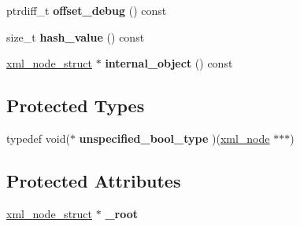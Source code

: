 \begin{DoxyCompactItemize}
\item 
\hypertarget{classpugi_1_1xml__node_a77b819bd87978bebefe75d421a793cf3}{ptrdiff\-\_\-t {\bfseries offset\-\_\-debug} () const }\label{classpugi_1_1xml__node_a77b819bd87978bebefe75d421a793cf3}

\item 
\hypertarget{classpugi_1_1xml__node_a5abfc3ec37d1dd9cd0aee6a46d6cf88d}{size\-\_\-t {\bfseries hash\-\_\-value} () const }\label{classpugi_1_1xml__node_a5abfc3ec37d1dd9cd0aee6a46d6cf88d}

\item 
\hypertarget{classpugi_1_1xml__node_a73e846c7ca8f6961a88150010c362ec6}{\hyperlink{structpugi_1_1xml__node__struct}{xml\-\_\-node\-\_\-struct} $\ast$ {\bfseries internal\-\_\-object} () const }\label{classpugi_1_1xml__node_a73e846c7ca8f6961a88150010c362ec6}

\end{DoxyCompactItemize}
\subsection*{Protected Types}
\begin{DoxyCompactItemize}
\item 
\hypertarget{classpugi_1_1xml__node_a5787a5097d439a75a335290cb6fcf2a8}{typedef void($\ast$ {\bfseries unspecified\-\_\-bool\-\_\-type} )(\hyperlink{classpugi_1_1xml__node}{xml\-\_\-node} $\ast$$\ast$$\ast$)}\label{classpugi_1_1xml__node_a5787a5097d439a75a335290cb6fcf2a8}

\end{DoxyCompactItemize}
\subsection*{Protected Attributes}
\begin{DoxyCompactItemize}
\item 
\hypertarget{classpugi_1_1xml__node_a45a5b342de1e37a60565f7693f03cc08}{\hyperlink{structpugi_1_1xml__node__struct}{xml\-\_\-node\-\_\-struct} $\ast$ {\bfseries \-\_\-root}}\label{classpugi_1_1xml__node_a45a5b342de1e37a60565f7693f03cc08}

\end{DoxyCompactItemize}
